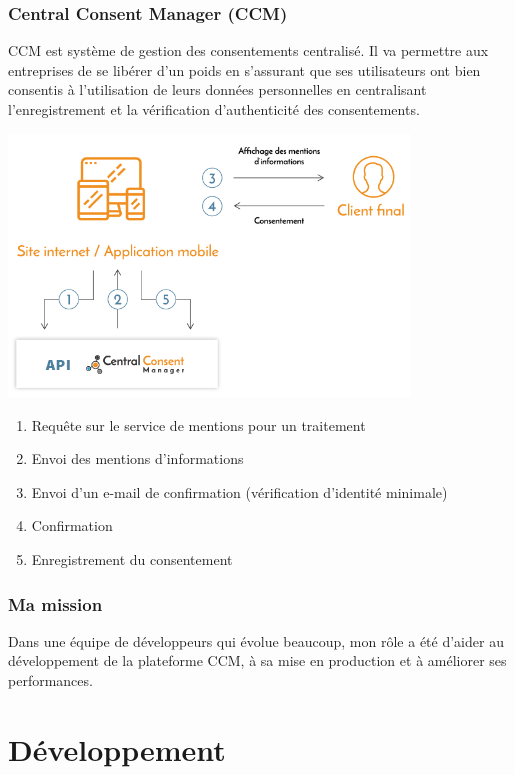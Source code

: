 \documentclass[12pt, a4paper]{report}
\newcommand\tab[1][1cm]{\hspace*{#1}}
\begin{document}
            \subsection{Central Consent Manager (CCM)}
                \tab{} CCM est système de gestion des consentements centralisé. Il va permettre aux entreprises de se libérer d'un poids en s'assurant que ses utilisateurs ont bien consentis à l'utilisation de leurs données personnelles en centralisant l'enregistrement et la vérification d'authenticité des consentements.
                \begin{center}
                    \includegraphics[width=0.8\textwidth]{ccm.png}
                \end{center}
                \begin{enumerate}
                    \item Requête sur le service de mentions pour un traitement
                    \item Envoi des mentions d'informations
                    \item Envoi d'un e-mail de confirmation (vérification d'identité minimale)
                    \item Confirmation
                    \item Enregistrement du consentement
                \end{enumerate}
            \subsection{Ma mission}
                \tab{} Dans une équipe de développeurs qui évolue beaucoup, mon rôle a été d'aider au développement de la plateforme CCM, à sa mise en production et à améliorer ses performances.
    \chapter{Développement}
\end{document}
